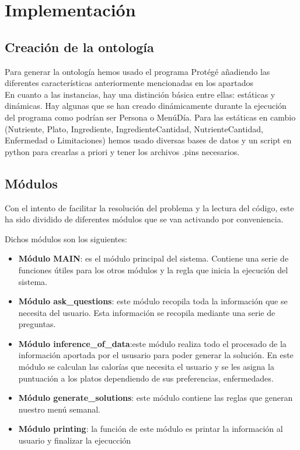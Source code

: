 \documentclass[12]{article}
\begin{document}
\section{Implementación}

\subsection{Creación de la ontología}
Para generar la ontología hemos usado el programa Protégé añadiendo las diferentes características anteriormente mencionadas en los apartados%
\\
En cuanto a las instancias, hay una distinción básica entre ellas: estáticas y dinámicas. Hay algunas que se han creado dinámicamente durante la ejecución del programa como podrían ser Persona o MenúDía. Para las estáticas en cambio (Nutriente, Plato, Ingrediente, IngredienteCantidad, NutrienteCantidad, Enfermedad o Limitaciones) hemos usado diversas bases de datos y un script en python para crearlas a priori y tener los archivos .pins necesarios. 
\subsection{Módulos}
Con el intento de facilitar la resolución del problema y la lectura del código, este ha sido dividido de diferentes módulos que se van activando por conveniencia.
\par
Dichos módulos son los siguientes:
\begin{itemize}
	\item \textbf{Módulo MAIN}: es el módulo principal del sistema. Contiene una serie de funciones útiles para los otros módulos y la regla que inicia la ejecución del sistema. 
	\item \textbf{Módulo ask\_questions}: este módulo recopila toda la información que se necesita del usuario. Esta información se recopila mediante una serie de preguntas. 
	\item \textbf{Módulo inference\_of\_data}:este módulo realiza todo el procesado de la información aportada por el ususario para poder generar la solución. En este módulo se calculan las calorías que necesita el usuario y se les asigna la puntuación a los platos dependiendo de sus preferencias, enfermedades.  
	\item \textbf{Módulo generate\_solutions}: este módulo contiene las reglas que generan nuestro menú semanal.
	\item \textbf{Módulo printing}: la función de este módulo es printar la información al usuario y finalizar la ejecucción
\end{itemize}
\end{document}
